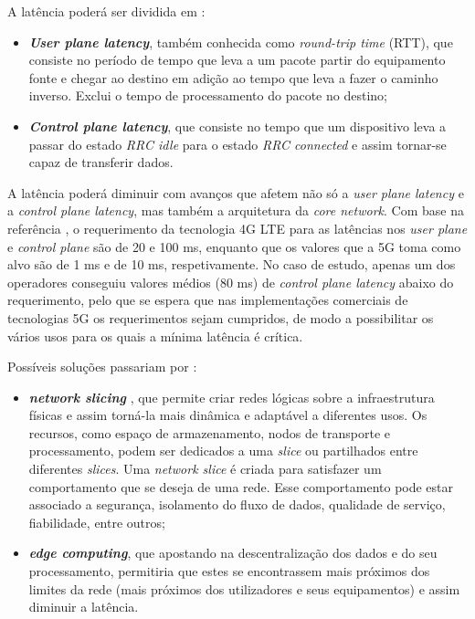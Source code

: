 \documentclass{llncs}
\begin{document}
A latência poderá ser dividida em :
\begin{itemize}
    \item \textit{\textbf{User plane latency}}, também conhecida como \textit{round-trip time} (RTT), que consiste no período de tempo que leva a um pacote partir do equipamento fonte e chegar ao destino em adição ao tempo que leva a fazer o caminho inverso. Exclui o tempo de processamento do pacote no destino;
    \item \textit{\textbf{Control plane latency}}, que consiste no tempo que um dispositivo leva a passar do estado \textit{RRC idle} para o estado \textit{RRC connected} e assim tornar-se capaz de transferir dados.
\end{itemize}

A latência poderá diminuir com avanços que afetem não só a \textit{user plane latency} e a \textit{control plane latency}, mas também a arquitetura da \textit{core network}. Com base na referência \cite{magazine}, o requerimento da tecnologia 4G LTE para as latências nos \textit{user plane} e \textit{control plane} são de 20 e 100 ms, enquanto que os valores que a 5G toma como alvo são de 1 ms e de 10 ms, respetivamente. No caso de estudo, apenas um dos operadores conseguiu valores médios (80 ms) de \textit{control plane latency} abaixo do requerimento, pelo que se espera que nas implementações comerciais de tecnologias 5G os requerimentos sejam cumpridos, de modo a possibilitar os vários usos para os quais a mínima latência é crítica.

Possíveis soluções passariam por :
\begin{itemize}
    \item \textit{\textbf{network slicing}} \cite{whitepaper}, que permite criar redes lógicas sobre a infraestrutura físicas e assim torná-la mais dinâmica e adaptável a diferentes usos. Os recursos, como espaço de armazenamento, nodos de transporte e processamento, podem ser dedicados a uma \textit{slice} ou partilhados entre diferentes \textit{slices}. Uma \textit{network slice} é criada para satisfazer um comportamento que se deseja de uma rede. Esse comportamento pode estar associado a segurança, isolamento do fluxo de dados, qualidade de serviço, fiabilidade, entre outros;
    \item \textit{\textbf{edge computing}}, que apostando na descentralização dos dados e do seu processamento, permitiria que estes se encontrassem mais próximos dos limites da rede (mais próximos dos utilizadores e seus equipamentos) e assim diminuir a latência.
\end{itemize}
\end{document}
